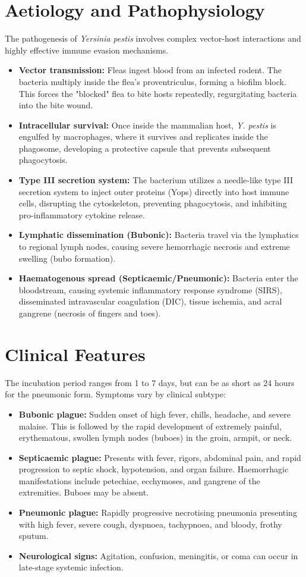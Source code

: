 \section*{Aetiology and Pathophysiology}
The pathogenesis of \textit{Yersinia pestis} involves complex vector-host interactions and highly effective immune evasion mechanisms.
\begin{itemize}
    \item \textbf{Vector transmission:} Fleas ingest blood from an infected rodent. The bacteria multiply inside the flea's proventriculus, forming a biofilm block. This forces the "blocked" flea to bite hosts repeatedly, regurgitating bacteria into the bite wound.
    \item \textbf{Intracellular survival:} Once inside the mammalian host, \textit{Y. pestis} is engulfed by macrophages, where it survives and replicates inside the phagosome, developing a protective capsule that prevents subsequent phagocytosis.
    \item \textbf{Type III secretion system:} The bacterium utilizes a needle-like type III secretion system to inject outer proteins (Yops) directly into host immune cells, disrupting the cytoskeleton, preventing phagocytosis, and inhibiting pro-inflammatory cytokine release.
    \item \textbf{Lymphatic dissemination (Bubonic):} Bacteria travel via the lymphatics to regional lymph nodes, causing severe hemorrhagic necrosis and extreme swelling (bubo formation).
    \item \textbf{Haematogenous spread (Septicaemic/Pneumonic):} Bacteria enter the bloodstream, causing systemic inflammatory response syndrome (SIRS), disseminated intravascular coagulation (DIC), tissue ischemia, and acral gangrene (necrosis of fingers and toes).
\end{itemize}

\section*{Clinical Features}
The incubation period ranges from 1 to 7 days, but can be as short as 24 hours for the pneumonic form. Symptoms vary by clinical subtype:
\begin{itemize}
    \item \textbf{Bubonic plague:} Sudden onset of high fever, chills, headache, and severe malaise. This is followed by the rapid development of extremely painful, erythematous, swollen lymph nodes (buboes) in the groin, armpit, or neck.
    \item \textbf{Septicaemic plague:} Presents with fever, rigors, abdominal pain, and rapid progression to septic shock, hypotension, and organ failure. Haemorrhagic manifestations include petechiae, ecchymoses, and gangrene of the extremities. Buboes may be absent.
    \item \textbf{Pneumonic plague:} Rapidly progressive necrotising pneumonia presenting with high fever, severe cough, dyspnoea, tachypnoea, and bloody, frothy sputum.
    \item \textbf{Neurological signs:} Agitation, confusion, meningitis, or coma can occur in late-stage systemic infection.
\end{itemize}

